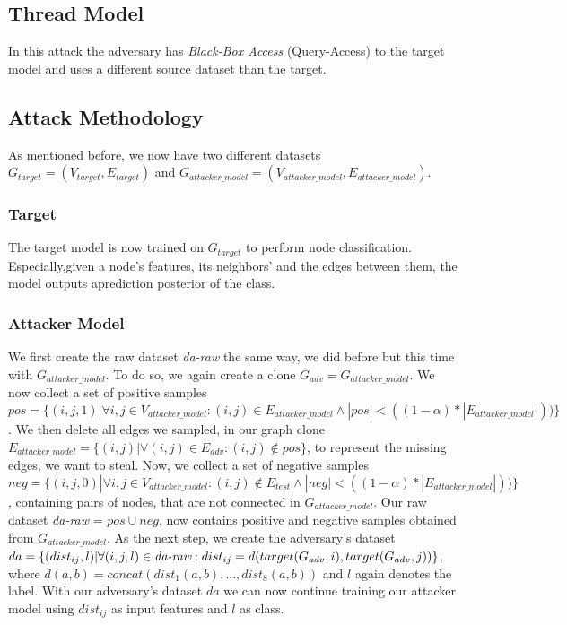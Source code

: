     \subsection{Thread Model}

      In this attack the adversary has \emph{Black-Box Access} (Query-Access) to the target model and uses a different source dataset than the target.

    \subsection{Attack Methodology}

      As mentioned before, we now have two different datasets $G_{target} = (V_{target}, E_{target})$ and $G_{attacker\_model} = (V_{attacker\_model}, E_{attacker\_model})$.

      \subsubsection{Target}

        The target model is now trained on $G_{target}$ to perform node classification.
        Especially,given a node’s features, its neighbors’ and the edges between them, the model outputs aprediction posterior of the class.

      \subsubsection{Attacker Model}

        We first create the raw dataset \emph{da-raw} the same way, we did before but this time with $G_{attacker\_model}$.
        To do so, we again create a clone $G_{adv} = G_{attacker\_model}$.
        We now collect a set of positive samples $pos = \{(i,j, 1) | \forall i,j \in V_{attacker\_model}: (i,j) \in E_{attacker\_model} \wedge |pos| < ((1 - \alpha) * |E_{attacker\_model}|))\}$.
        We then delete all edges we sampled, in our graph clone $E_{attacker\_model} = \{(i,j) | \forall (i,j) \in E_{adv}: (i,j) \not\in pos\}$, to represent the missing edges, we want to steal.
        Now, we collect a set of negative samples $neg = \{(i,j, 0) | \forall i,j \in V_{attacker\_model}: (i,j) \not\in E_{test} \wedge |neg| < ((1 - \alpha) * |E_{attacker\_model}|))\}$, containing pairs of nodes, that are not connected in $G_{attacker\_model}$.
        Our raw dataset \emph{da-raw} = $pos \cup neg$, now contains positive and negative samples obtained from $G_{attacker\_model}$.
        As the next step, we create the adversary's dataset $da = \{(dist_{ij}, l) | \forall (i,j,l)\in\emph{da-raw}: dist_{ij} = d(target(G_{adv}, i), target(G_{adv}, j))\}$, where $d(a,b) = concat(dist_1(a,b), ..., dist_8(a,b))$ and $l$ again denotes the label.
        With our adversary's dataset $da$ we can now continue training our attacker model using $dist_{ij}$ as input features and $l$ as class.



